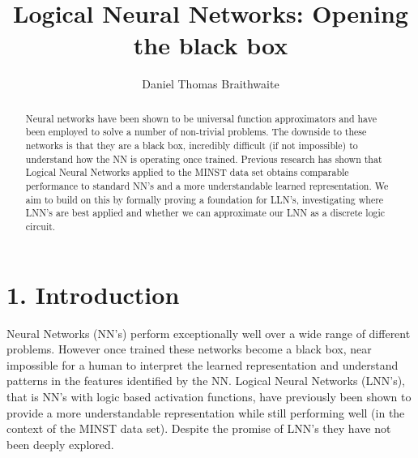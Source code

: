 \documentclass[11pt, a4paper, twoside, openright]{report}
\title{Logical Neural Networks: Opening the black box}
\author{Daniel Thomas Braithwaite}
\date{}
\begin{document}
\frontmatter


\begin{abstract}
Neural networks have been shown to be universal function approximators and have been employed to solve a number of non-trivial problems. The downside to these networks is that they are a black box, incredibly difficult (if not impossible) to understand how the NN is operating once trained. Previous research has shown that Logical Neural Networks applied to the MINST data set obtains comparable performance to standard NN's and a more understandable learned representation. We aim to build on this by formally proving a foundation for LLN's, investigating where LNN's are best applied and whether we can approximate our LNN as a discrete logic circuit.
\end{abstract}


\maketitle




\mainmatter


\section*{1. Introduction}

Neural Networks (NN's) perform exceptionally well over a wide range of different problems. However once trained these networks become a black box, near impossible for a human to interpret the learned representation and understand patterns in the features identified by the NN. Logical Neural Networks (LNN's), that is NN's with logic based activation functions, have previously been shown to provide a more understandable representation while still performing well \cite{LearningLogicalActivations} (in the context of the MINST data set). Despite the promise of LNN's they have not been deeply explored.
\end{document}
